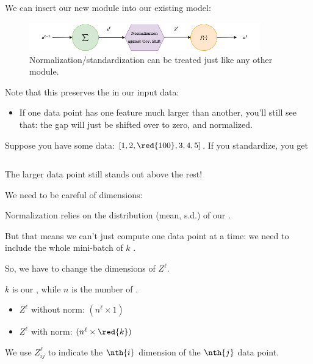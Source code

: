             We can insert our new module into our existing model:


            \begin{figure}[H]
                \centering
                    \includegraphics[width=100mm,scale=0.5]{images/nn_2_images/cov_shift_neuron.png}
                
                \caption*{Normalization/standardization can be treated just like any other module.}
            \end{figure}

            \phantom{}

            Note that this preserves the  in our input data:
            
            \begin{itemize}
                \item If one data point has one feature much larger than another, you'll still see that: the gap will just be shifted over to zero, and normalized.
                
            \end{itemize}

            \miniex Suppose you have some data: $[1,2,\red{100},3,4,5]$. If you standardize, you get

            \begin{equation}
                [-0.458, -0.433, \red{2.04}, -0.408, -0.383, -0.358, ]
            \end{equation}

            The larger data point still stands out above the rest!
            
            We need to be careful of dimensions:\\

            \begin{clarification}
                Normalization relies on the distribution (mean, s.d.) of our .

                But that means we can't just compute one data point at a time: we need to include the whole mini-batch of $k$ .

                So, we have to change the dimensions of $Z^\ell$.

                $k$ is our , while $n$ is the number of . 
                

                \begin{itemize}
                    \item $Z^\ell$ without norm: $(n^\ell \times 1)$
                    \item $Z^\ell$ with norm: $(n^\ell \times \red{k})$
                \end{itemize}

                We use $Z_{ij}^\ell$ to indicate the $\nth{i}$ dimension of the $\nth{j}$ data point.
            \end{clarification}
            

